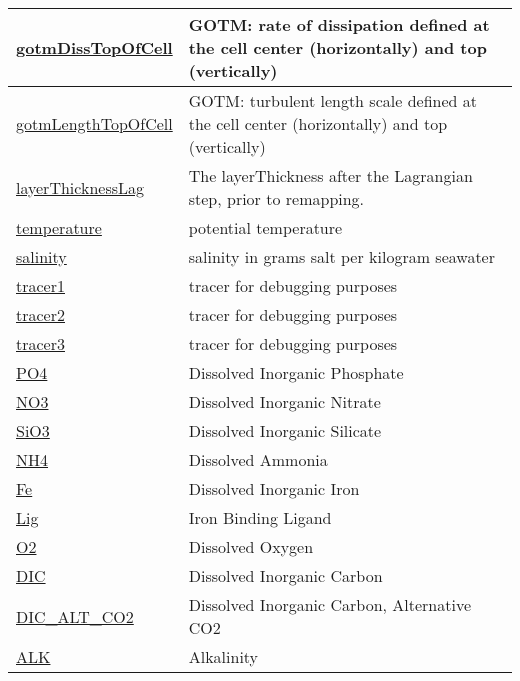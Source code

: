 {\begin{center}
\begin{longtable}{| p{2.0in} | p{4.0in} |}
    \hline
    \hyperref[subsec:var_sec_state_gotmDissTopOfCell]{gotmDissTopOfCell} & GOTM: rate of dissipation defined at the cell center (horizontally) and top (vertically) \\
    \hline
    \hyperref[subsec:var_sec_state_gotmLengthTopOfCell]{gotmLengthTopOfCell} & GOTM: turbulent length scale defined at the cell center (horizontally) and top (vertically) \\
    \hline
    \hyperref[subsec:var_sec_state_layerThicknessLag]{layerThicknessLag} & The layerThickness after the Lagrangian step, prior to remapping. \\
    \hline
    \hyperref[subsec:var_sec_state_temperature]{temperature} & potential temperature \\
    \hline
    \hyperref[subsec:var_sec_state_salinity]{salinity} & salinity in grams salt per kilogram seawater \\
    \hline
    \hyperref[subsec:var_sec_state_tracer1]{tracer1} & tracer for debugging purposes \\
    \hline
    \hyperref[subsec:var_sec_state_tracer2]{tracer2} & tracer for debugging purposes \\
    \hline
    \hyperref[subsec:var_sec_state_tracer3]{tracer3} & tracer for debugging purposes \\
    \hline
    \hyperref[subsec:var_sec_state_PO4]{PO4} & Dissolved Inorganic Phosphate \\
    \hline
    \hyperref[subsec:var_sec_state_NO3]{NO3} & Dissolved Inorganic Nitrate \\
    \hline
    \hyperref[subsec:var_sec_state_SiO3]{SiO3} & Dissolved Inorganic Silicate \\
    \hline
    \hyperref[subsec:var_sec_state_NH4]{NH4} & Dissolved Ammonia \\
    \hline
    \hyperref[subsec:var_sec_state_Fe]{Fe} & Dissolved Inorganic Iron \\
    \hline
    \hyperref[subsec:var_sec_state_Lig]{Lig} & Iron Binding Ligand \\
    \hline
    \hyperref[subsec:var_sec_state_O2]{O2} & Dissolved Oxygen \\
    \hline
    \hyperref[subsec:var_sec_state_DIC]{DIC} & Dissolved Inorganic Carbon \\
    \hline
    \hyperref[subsec:var_sec_state_DIC_ALT_CO2]{DIC\_ALT\_CO2} & Dissolved Inorganic Carbon, Alternative CO2 \\
    \hline
    \hyperref[subsec:var_sec_state_ALK]{ALK} & Alkalinity \\

\end{longtable}
\end{center}}
